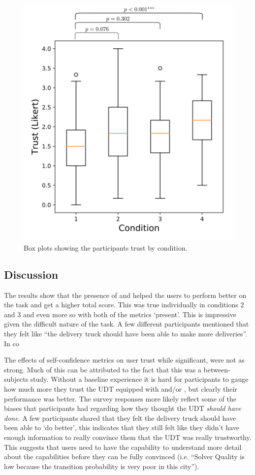        \begin{figure}[tb]
            \centering
            \includegraphics[width=0.8\linewidth]{Figures/trust_box.png}
            \caption{Box plots showing the participants trust by condition.}
            \label{fig:trust_box}
       \end{figure}

\subsection{Discussion}
The results show that the presence of \xQ{} and \xO{} helped the users to perform better on the task and get a higher total score. This was true individually in conditions 2 and 3 and even more so with both of the metrics `present'. This is impressive given the difficult nature of the task. A few different participants mentioned that they felt like ``the delivery truck should have been able to make more deliveries''. In co

The effects of self-confidence metrics on user trust while significant, were not as strong. Much of this can be attributed to the fact that this was a between-subjects study. Without a baseline experience it is hard for participants to gauge how much more they trust the UDT equipped with \xQ{} and/or \xO, but clearly their performance was better. The survey responses more likely reflect some of the biases that participants had regarding how they thought the UDT \emph{should have done}. A few participants shared that they felt the delivery truck should have been able to `do better', this indicates that they still felt like they didn't have enough information to really convince them that the UDT was really trustworthy. This suggests that users need to have the capability to understand more detail about the capabilities before they can be fully convinced (i.e. ``Solver Quality is low because the transition probability is very poor in this city'').


